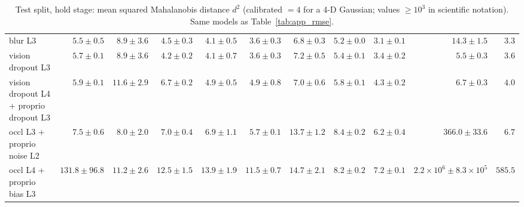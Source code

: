 \begin{table}[p]
{\begin{tabular}{lrrrrrrrrrr}
blur L3 & $5.5{\pm}0.5$ & $8.9{\pm}3.6$ & $4.5{\pm}0.3$ & $4.1{\pm}0.5$ & $3.6{\pm}0.3$ & $6.8{\pm}0.3$ & $5.2{\pm}0.0$ & $3.1{\pm}0.1$ & $14.3{\pm}1.5$ & $3.3$ \\
vision dropout L3 & $5.7{\pm}0.1$ & $8.9{\pm}3.6$ & $4.2{\pm}0.2$ & $4.1{\pm}0.7$ & $3.6{\pm}0.3$ & $7.2{\pm}0.5$ & $5.4{\pm}0.1$ & $3.4{\pm}0.2$ & $5.5{\pm}0.3$ & $3.6$ \\
vision dropout L4 {+} proprio dropout L3 & $5.9{\pm}0.1$ & $11.6{\pm}2.9$ & $6.7{\pm}0.2$ & $4.9{\pm}0.5$ & $4.9{\pm}0.8$ & $7.0{\pm}0.6$ & $5.8{\pm}0.1$ & $4.3{\pm}0.2$ & $6.7{\pm}0.3$ & $4.0$ \\
occl L3 {+} proprio noise L2 & $7.5{\pm}0.6$ & $8.0{\pm}2.0$ & $7.0{\pm}0.4$ & $6.9{\pm}1.1$ & $5.7{\pm}0.1$ & $13.7{\pm}1.2$ & $8.4{\pm}0.2$ & $6.2{\pm}0.4$ & $366.0{\pm}33.6$ & $6.7$ \\
occl L4 {+} proprio bias L3 & $131.8{\pm}96.8$ & $11.2{\pm}2.6$ & $12.5{\pm}1.5$ & $13.9{\pm}1.9$ & $11.5{\pm}0.7$ & $14.7{\pm}2.1$ & $8.2{\pm}0.2$ & $7.2{\pm}0.1$ & $2.2\!\times\!10^{6}{\pm}8.3\!\times\!10^{5}$ & $585.5$ \\
\bottomrule\end{tabular}}
\caption{Test split, hold stage: mean squared Mahalanobis distance $d^2$ (calibrated $=4$ for a 4-D Gaussian; values $\ge 10^3$ in scientific notation). Same models as Table~\ref{tab:app_rmse}.}\label{tab:app_d2}\end{table}

